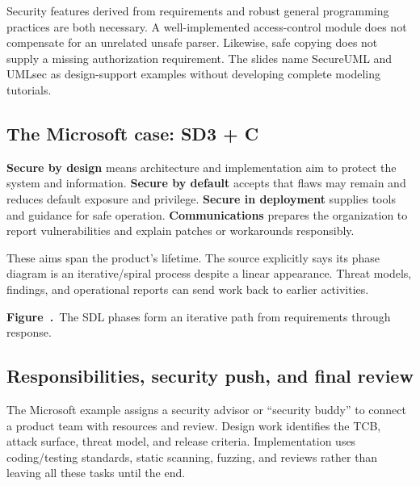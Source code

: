 \documentclass[11pt,a4paper]{article}
\numberwithin{figure}{section}
\newcommand{\diagramcaption}[1]{\par\smallskip\refstepcounter{figure}\begin{center}\small\textbf{Figure~\thefigure.}~#1\end{center}}
\begin{document}
\endgroup
Security features derived from requirements and robust general programming practices are both necessary. A well-implemented access-control module does not compensate for an unrelated unsafe parser. Likewise, safe copying does not supply a missing authorization requirement. The slides name SecureUML and UMLsec as design-support examples without developing complete modeling tutorials.

\subsection{The Microsoft case: SD3 + C}
\textbf{Secure by design} means architecture and implementation aim to protect the system and information. \textbf{Secure by default} accepts that flaws may remain and reduces default exposure and privilege. \textbf{Secure in deployment} supplies tools and guidance for safe operation. \textbf{Communications} prepares the organization to report vulnerabilities and explain patches or workarounds responsibly.

These aims span the product's lifetime. The source explicitly says its phase diagram is an iterative/spiral process despite a linear appearance. Threat models, findings, and operational reports can send work back to earlier activities.

\begin{center}\end{center}
\diagramcaption{The SDL phases form an iterative path from requirements through response.}

\subsection{Responsibilities, security push, and final review}
The Microsoft example assigns a security advisor or ``security buddy'' to connect a product team with resources and review. Design work identifies the TCB, attack surface, threat model, and release criteria. Implementation uses coding/testing standards, static scanning, fuzzing, and reviews rather than leaving all these tasks until the end.
\end{document}
